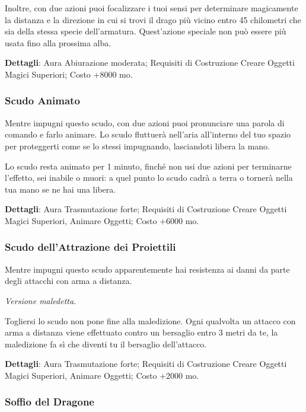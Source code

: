 \begin{multicols}{2}
	Inoltre, con due azioni puoi focalizzare i tuoi sensi per determinare magicamente la distanza e la direzione in cui si trovi il drago più vicino entro 45 chilometri che sia della stessa specie dell'armatura. Quest'azione speciale non può essere più usata fino alla prossima alba.

	\textbf{Dettagli}: Aura Abiurazione moderata; Requisiti di Costruzione Creare Oggetti Magici Superiori; Costo +8000 mo.

	\subsubsection*{Scudo Animato}

	Mentre impugni questo scudo, con due azioni puoi pronunciare una parola di comando e farlo animare. Lo scudo fluttuerà nell'aria all'interno del tuo spazio per proteggerti come se lo stessi impugnando, lasciandoti libera la mano.

	Lo scudo resta animato per 1 minuto, finché non usi due azioni per terminarne l'effetto, sei inabile o muori: a quel punto lo scudo cadrà a terra o tornerà nella tua mano se ne hai una libera.

	\textbf{Dettagli}: Aura Trasmutazione forte; Requisiti di Costruzione Creare Oggetti Magici Superiori, Animare Oggetti; Costo +6000 mo.

	\subsubsection*{Scudo dell'Attrazione dei Proiettili}

	Mentre impugni questo scudo apparentemente hai resistenza ai danni da parte degli attacchi con arma a distanza.

	\textit{Versione maledetta}.

	Togliersi lo scudo non pone fine alla maledizione. Ogni qualvolta un attacco con arma a distanza viene effettuato contro un bersaglio entro 3 metri da te, la maledizione fa sì che diventi tu il bersaglio dell'attacco.

	\textbf{Dettagli}: Aura Trasmutazione forte; Requisiti di Costruzione Creare Oggetti Magici Superiori, Animare Oggetti; Costo +2000 mo.


	\subsubsection*{Soffio del Dragone}


\end{multicols}
